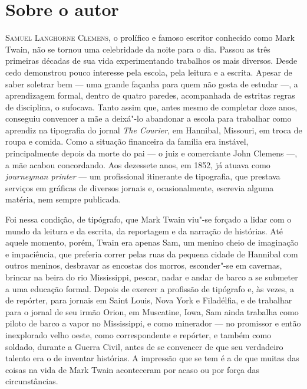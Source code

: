 
\section{Sobre o autor}

\noindent\textsc{Samuel Langhorne Clemens,} o prolífico e famoso escritor conhecido como Mark
Twain, não se tornou uma celebridade da noite para o dia. Passou as três
primeiras décadas de sua vida experimentando trabalhos os mais diversos.
Desde cedo demonstrou pouco interesse pela escola,
pela leitura e a escrita. Apesar de saber soletrar bem --- uma grande
façanha para quem não gosta de estudar ---, a aprendizagem formal, dentro de
quatro paredes, acompanhada de estritas regras de disciplina, o sufocava. Tanto assim que, antes mesmo de
completar doze anos, conseguiu convencer a mãe a deixá"-lo abandonar 
a escola para trabalhar como aprendiz na tipografia do jornal \textit{The Courier},
em Hannibal, Missouri, em troca de roupa e comida. Como a situação
financeira da família era instável, principalmente depois da morte do pai
--- o juiz e comerciante John Clemens ---, a mãe acabou concordando. Aos dezessete
anos, em 1852, já atuava como \textit{journeyman printer} --- um
profissional itinerante de tipografia, que prestava serviços em gráficas
de diversos jornais e, ocasionalmente, escrevia alguma matéria, nem
sempre publicada.

Foi nessa condição, de tipógrafo, que Mark Twain
viu"-se forçado a lidar com o mundo da leitura e da escrita, da reportagem
e da narração de histórias. Até aquele momento, porém, Twain era
apenas Sam, um menino cheio de imaginação e impaciência, que preferia
correr pelas ruas da pequena cidade de Hannibal com outros meninos,
desbravar as encostas dos morros, esconder"-se em cavernas, brincar na
beira do rio Mississippi, pescar, nadar e andar de barco a se submeter a
uma educação formal. Depois de exercer a profissão de tipógrafo e, às
vezes, a de repórter, para jornais em Saint Louis, Nova York e
Filadélfia, e de trabalhar para o jornal de seu irmão Orion, em
Muscatine, Iowa, Sam ainda trabalha como piloto de barco a vapor no
Mississippi, e como minerador --- no promissor e então inexplorado velho oeste,
como correspondente e repórter, e também como soldado, durante a Guerra
Civil, antes de se convencer de que seu verdadeiro talento era o de inventar
histórias. A impressão que se tem é a de que muitas das coisas na vida de
Mark Twain aconteceram por acaso ou por força das circunstâncias.

